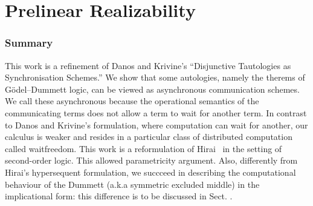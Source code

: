 \chapter{Prelinear Realizability}




% 


\renewcommand{\vec}{\overrightarrow}
\newcommand{\sche}{\sqsubseteq}


\newcommand{\sequent}[2]{{#1}\tr{#2}}
\newcommand{\aseq}[2]{\AxiomC{$\sequent{#1}{#2}$}}
\newcommand{\useq}[2]{\UnaryInfC{$\sequent{#1}{#2}$}}
\newcommand{\bseq}[2]{\BinaryInfC{$\sequent{#1}{#2}$}}
\newcommand{\tseq}[2]{\TrinaryInfC{$\sequent{#1}{#2}$}}

\newcommand{\limp}{\multimap}


\subsection{Summary}
This work is a refinement of
Danos and Krivine's ``Disjunctive Tautologies as
Synchronisation Schemes.''
We show that some autologies,
namely the therems of G\"odel--Dummett logic,
can be viewed as asynchronous communication schemes.
We call these asynchronous because the operational semantics
of the communicating terms does not allow a term to wait for another
term.
In contrast to Danos and Krivine's  formulation,
where computation can wait for another,
our calculus is weaker and resides in a particular class of
distributed computation called waitfreedom.
This work is a reformulation of Hirai~ in the setting of
second-order logic.
This allowed parametricity argument.
Also, differently from Hirai's  hypersequent formulation,
we succceed in describing the computational behaviour of the Dummett
(a.k.a symmetric excluded middle) in the implicational form: this
difference is to be discussed in Sect. .

